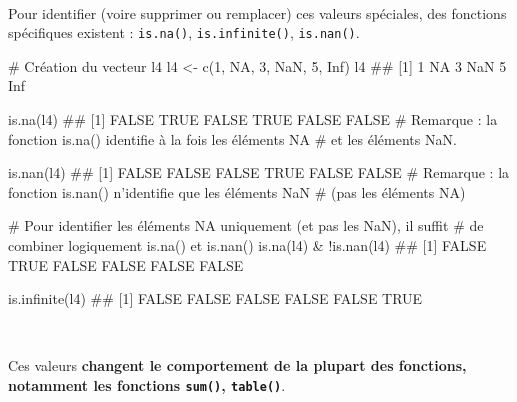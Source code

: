\documentclass[12pt,twosided, notitlepage]{book}
\newenvironment{Shaded}{}{}
\newcommand{\CommentTok}[1]{\textcolor[rgb]{0.00,0.50,0.00}{#1}}
\newcommand{\DecValTok}[1]{#1}
\newcommand{\KeywordTok}[1]{\textcolor[rgb]{0.00,0.00,1.00}{#1}}
\newcommand{\NormalTok}[1]{#1}
\newcommand{\OperatorTok}[1]{#1}
\newcommand{\OtherTok}[1]{\textcolor[rgb]{1.00,0.25,0.00}{#1}}
\newcommand{\StringTok}[1]{\textcolor[rgb]{0.00,0.50,0.50}{#1}}
\renewenvironment{Shaded}{\begin{snugshade}}{\end{snugshade}}
\begin{document}
~

Pour identifier (voire supprimer ou remplacer) ces valeurs spéciales,
des fonctions spécifiques existent :
\texttt{is.na()},
\texttt{is.infinite()},
\texttt{is.nan()}.

\begin{Shaded}
\begin{Highlighting}[]
\CommentTok{# Création du vecteur l4}
\NormalTok{l4 <-}\StringTok{ }\KeywordTok{c}\NormalTok{(}\DecValTok{1}\NormalTok{, }\OtherTok{NA}\NormalTok{, }\DecValTok{3}\NormalTok{, }\OtherTok{NaN}\NormalTok{, }\DecValTok{5}\NormalTok{, }\OtherTok{Inf}\NormalTok{)}
\NormalTok{l4}
\NormalTok{  ## [1]   1  NA   3 NaN   5 Inf}

\KeywordTok{is.na}\NormalTok{(l4)}
\NormalTok{  ## [1] FALSE  TRUE FALSE  TRUE FALSE FALSE}
\CommentTok{# Remarque : la fonction is.na() identifie à la fois les éléments NA}
\CommentTok{# et les éléments NaN. }

\KeywordTok{is.nan}\NormalTok{(l4)}
\NormalTok{  ## [1] FALSE FALSE FALSE  TRUE FALSE FALSE}
\CommentTok{# Remarque : la fonction is.nan() n'identifie que les éléments NaN}
\CommentTok{# (pas les éléments NA)}

\CommentTok{# Pour identifier les éléments NA uniquement (et pas les NaN), il suffit}
\CommentTok{# de combiner logiquement is.na() et is.nan()}
\KeywordTok{is.na}\NormalTok{(l4) }\OperatorTok{&}\StringTok{ }\OperatorTok{!}\KeywordTok{is.nan}\NormalTok{(l4)}
\NormalTok{  ## [1] FALSE  TRUE FALSE FALSE FALSE FALSE}

\KeywordTok{is.infinite}\NormalTok{(l4)}
\NormalTok{  ## [1] FALSE FALSE FALSE FALSE FALSE  TRUE}
\end{Highlighting}
\end{Shaded}

~

Ces valeurs \textbf{changent le comportement de la plupart des
fonctions, notamment les fonctions \texttt{sum()},
\texttt{table()}}.
\end{document}
